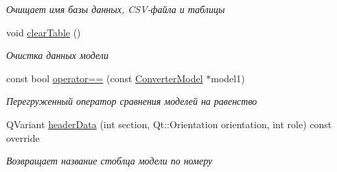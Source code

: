 \begin{DoxyCompactItemize}
\begin{DoxyCompactList}\small\item\em Очищает имя базы данных, C\+S\+V-\/файла и таблицы \end{DoxyCompactList}\item 
void \hyperlink{classConverterModel_a85d10deabb8e07ff372be441cdca45e0}{clear\+Table} ()\hypertarget{classConverterModel_a85d10deabb8e07ff372be441cdca45e0}{}\label{classConverterModel_a85d10deabb8e07ff372be441cdca45e0}

\begin{DoxyCompactList}\small\item\em Очистка данных модели \end{DoxyCompactList}\item 
const bool \hyperlink{classConverterModel_a9646314f29ab36a3fe0b15edb543374d}{operator==} (const \hyperlink{classConverterModel}{Converter\+Model} $\ast$model1)\hypertarget{classConverterModel_a9646314f29ab36a3fe0b15edb543374d}{}\label{classConverterModel_a9646314f29ab36a3fe0b15edb543374d}

\begin{DoxyCompactList}\small\item\em Перегруженный оператор сравнения моделей на равенство \end{DoxyCompactList}\item 
Q\+Variant \hyperlink{classConverterModel_a91ac4f80ed87ada3b70a14752699cb0c}{header\+Data} (int section, Qt\+::\+Orientation orientation, int role) const override
\begin{DoxyCompactList}\small\item\em Возвращает название стоблца модели по номеру \end{DoxyCompactList}\end{DoxyCompactItemize}
